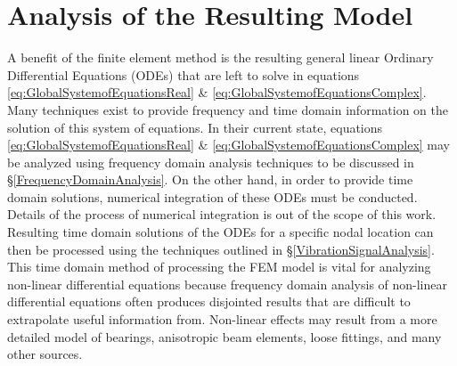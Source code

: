 \section{Analysis of the Resulting Model}
A benefit of the finite element method is the resulting general linear Ordinary Differential Equations (ODEs) that are left to solve in equations \eqref{eq:GlobalSystemofEquationsReal} \& \eqref{eq:GlobalSystemofEquationsComplex}. Many techniques exist to provide frequency and time domain information on the solution of this system of equations. In their current state, equations \eqref{eq:GlobalSystemofEquationsReal} \& \eqref{eq:GlobalSystemofEquationsComplex} may be analyzed using frequency domain analysis techniques to be discussed in \S\ref{FrequencyDomainAnalysis}. On the other hand, in order to provide time domain solutions, numerical integration of these ODEs must be conducted. Details of the process of numerical integration is out of the scope of this work. Resulting time domain solutions of the ODEs for a specific nodal location can then be processed using the techniques outlined in \S\ref{VibrationSignalAnalysis}. This time domain method of processing the FEM model is vital for analyzing non-linear differential equations because frequency domain analysis of non-linear differential equations often produces disjointed results that are difficult to extrapolate useful information from. Non-linear effects may result from a more detailed model of bearings, anisotropic beam elements, loose fittings, and many other sources.\par